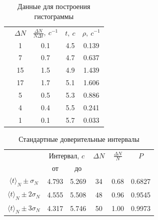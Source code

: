 \documentclass[12pt]{article}
\begin{document}
\begin{table}[h]
    \centering
    \captionsetup{justification=centering, font=bf}
    \caption{Данные для построения гистограммы}
    \renewcommand{\arraystretch}{1.5}
    \begin{tabular}{|c|c|c|c|c|}
        \hline
         & 
         & 
         & 
         & 
         \\
        & & & & \\
        \hline
        [4.4; 4.6] & 1 & 0.1 & 4.5 & 0.139 \\
        \hline
        [4.6; 4.8] & 7 & 0.7 & 4.7 & 0.637 \\
        \hline
        [4.8; 5.0] & 15 & 1.5 & 4.9 & 1.439 \\
        \hline
        [5.0; 5.2] & 17 & 1.7 & 5.1 & 1.606 \\
        \hline
        [5.2; 5.4] & 5 & 0.5 & 5.3 & 0.886 \\
        \hline
        [5.4; 5.6] & 4 & 0.4 & 5.5 & 0.241 \\
        \hline
        [5.6; 5.8] & 1 & 0.1 & 5.7 & 0.033 \\
        \hline
    \end{tabular}
\end{table}

\begin{table}[h]
    \centering
    \captionsetup{justification=centering, font=bf}
    \caption{Стандартные доверительные интервалы}
    \renewcommand{\arraystretch}{1.5}
    \begin{tabular}{|c|c|c|c|c|c|}
        \hline
        & \multicolumn{2}{c|}{Интервал, $c$} & $\Delta N$ & $\frac{\Delta N}{N}$ & $P$ \\
        \cline{2-3}
        & от & до & & & \\
        \hline
        $\langle t \rangle_N \pm \sigma_N$ & 4.793 & 5.269 & 34 & 0.68 & 0.6827 \\
        \hline
        $\langle t \rangle_N \pm 2\sigma_N$ & 4.555 & 5.508 & 48 & 0.96 & 0.9545 \\  
        \hline
        $\langle t \rangle_N \pm 3\sigma_N$ & 4.317 & 5.746 & 50 & 1.00 & 0.9973 \\ 
        \hline
    \end{tabular}
\end{table}
\end{document}
